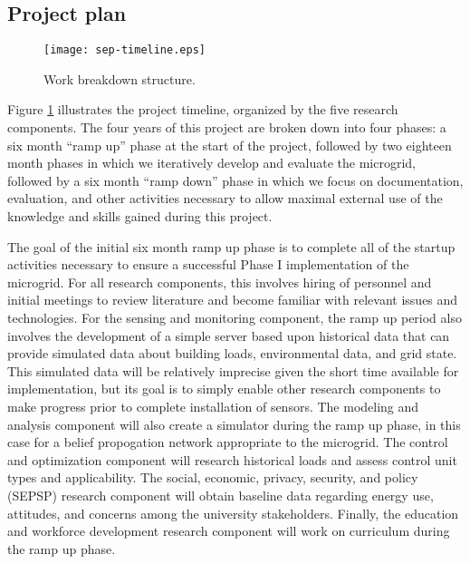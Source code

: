 
\subsection{Project plan}

\begin{figure}[t]
  \begin{center}
   \texttt{[image: sep-timeline.eps]}
   \caption{Work breakdown structure.}
  \label{fig:timeline}
  \end{center}
\end{figure}

Figure \ref{fig:timeline} illustrates the project timeline, organized by
the five research components.  The four years of this project are broken
down into four phases: a six month ``ramp up'' phase at the start of the
project, followed by two eighteen month phases in which we iteratively
develop and evaluate the microgrid, followed by a six month ``ramp down''
phase in which we focus on documentation, evaluation, and other activities
necessary to allow maximal external use of the knowledge and skills gained
during this project. 

The goal of the initial six month ramp up phase is to complete all of the
startup activities necessary to ensure a successful Phase I implementation
of the microgrid.  For all research components, this involves hiring of
personnel and initial meetings to review literature and become familiar
with relevant issues and technologies. For the sensing and monitoring
component, the ramp up period also involves the development of a simple
server based upon historical data that can provide simulated data about
building loads, environmental data, and grid state.  This simulated data
will be relatively imprecise given the short time available for
implementation, but its goal is to simply enable other research components
to make progress prior to complete installation of sensors.  The modeling
and analysis component will also create a simulator during the ramp up
phase, in this case for a belief propogation network appropriate to the
microgrid. The control and optimization component will research historical
loads and assess control unit types and applicability.   The social,
economic, privacy, security, and policy (SEPSP) research component will
obtain baseline data regarding energy use, attitudes, and concerns
among the university stakeholders. Finally, the education and workforce
development research component will work on curriculum during the ramp up
phase. 

